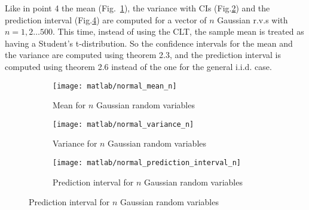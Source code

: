 \documentclass{article}
\begin{document}
Like in point 4 the mean (Fig.~\ref{gaussian_mean_n}), the variance
with CIs (Fig.\ref{gaussian_var_n}) and the prediction interval
(Fig.\ref{gaussian_pred_int_n}) are computed for a vector of $n$
Gaussian r.v.s with $n = 1,2\dots500$. This time, instead of using the
CLT, the sample mean is treated as having a Student's
t-distribution. So the confidence intervals for the mean and the
variance are computed using theorem 2.3, and the prediction interval
is computed using theorem 2.6 instead of the one for the general
i.i.d. case.
\begin{figure}[htbp]
  \centering
  \begin{subfigure}{.5\textwidth}
    \centering
    \texttt{[image: matlab/normal\_mean\_n]}
    \caption{Mean for $n$ Gaussian random variables}
    \label{gaussian_mean_n}
  \end{subfigure}%
  \begin{subfigure}{.5\textwidth}
    \centering
    \texttt{[image: matlab/normal\_variance\_n]}
    \caption{Variance for $n$ Gaussian random variables}
    \label{gaussian_var_n}
  \end{subfigure}
  \begin{subfigure}{.5\textwidth}
    \centering
    \texttt{[image: matlab/normal\_prediction\_interval\_n]}
    \caption{Prediction interval for $n$ Gaussian random variables}
    \label{gaussian_pred_int_n}
  \end{subfigure}
\end{figure}
\end{document}
